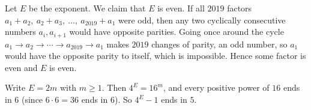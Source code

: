 Let $E$ be the exponent. We claim that $E$ is even. If all $2019$ factors $a_1+a_2,\ a_2+a_3,\ \dots,\ a_{2019}+a_1$ were odd, then any two cyclically consecutive numbers $a_i,a_{i+1}$ would have opposite parities. Going once around the cycle $a_1\to a_2\to\cdots\to a_{2019}\to a_1$ makes $2019$ changes of parity, an odd number, so $a_1$ would have the opposite parity to itself, which is impossible. Hence some factor is even and $E$ is even.

Write $E=2m$ with $m\ge1$. Then $4^E=16^m$, and every positive power of $16$ ends in $6$ (since $6\cdot6=36$ ends in $6$). So $4^E-1$ ends in $\boxed{5}$.
